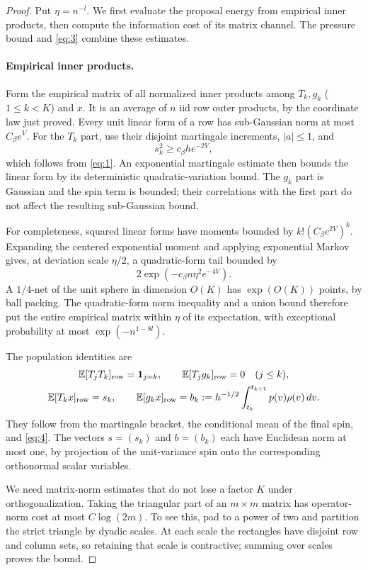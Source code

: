\begin{proof}
Put $\eta=n^{-l}$. We first evaluate the proposal energy from empirical
inner products, then compute the information cost of its matrix
channel. The pressure bound and \eqref{eq:3} combine these estimates.

\paragraph{Empirical inner products.}
Form the empirical matrix of all normalized inner products among
$T_k,g_k$ ($1\le k<K$) and $x$. It is an average of $n$ iid row
outer products, by the coordinate law just proved. Every unit linear
form of a row has sub-Gaussian norm at most $C_\beta e^V$.
For the $T_k$ part, use their disjoint martingale increments,
$|a|\le1$, and
\[
 s_k^2\ge c_\beta h e^{-2V},
\]
which follows from \eqref{eq:1}. An exponential martingale estimate
then bounds the linear form by its deterministic quadratic-variation
bound. The $g_k$ part is Gaussian and the spin term is bounded; their
correlations with the first part do not affect the resulting
sub-Gaussian bound.

For completeness, squared linear forms have moments bounded by
$k!(C_\beta e^{2V})^k$. Expanding the centered exponential moment
and applying exponential Markov gives, at deviation scale $\eta/2$,
a quadratic-form tail bounded by
\[
 2\exp(-c_\beta n\eta^2e^{-4V}).
\]
A $1/4$-net of the unit sphere in dimension $O(K)$ has
$\exp(O(K))$ points, by ball packing. The quadratic-form norm
inequality and a union bound therefore put the entire empirical
matrix within $\eta$ of its expectation, with exceptional probability
at most $\exp(-n^{1-8l})$.

The population identities are
\[
 \begin{gathered}
 \mathbb E[T_jT_k]_{\rm row}=\mathbf1_{j=k},\qquad
 \mathbb E[T_jg_k]_{\rm row}=0\quad(j\le k),\\
 \mathbb E[T_kx]_{\rm row}=s_k,\qquad
 \mathbb E[g_kx]_{\rm row}=b_k
   :=h^{-1/2}\int_{t_k}^{t_{k+1}}p(v)\rho(v)\,dv.
 \end{gathered}
\]
They follow from the martingale bracket, the conditional mean of the
final spin, and \eqref{eq:4}. The vectors $s=(s_k)$ and $b=(b_k)$
each have Euclidean norm at most one, by projection of the unit-variance
spin onto the corresponding orthonormal scalar variables.

We need matrix-norm estimates that do not lose a factor $K$ under
orthogonalization. Taking the triangular part of an $m\times m$
matrix has operator-norm cost at most $C\log(2m)$. To see this, pad
to a power of two and partition the strict triangle by dyadic scales.
At each scale the rectangles have disjoint row and column sets, so
retaining that scale is contractive; summing over scales proves the
bound.


\end{proof}
